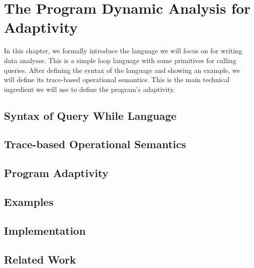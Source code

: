 \chapter{The Program Dynamic Analysis for Adaptivity}
\label{ch:adapt-dynamic}
In this chapter, we formally introduce the language we will focus on for writing data analyses.  
This is a simple loop language with some primitives for calling queries. 
After defining the syntax of the language and showing an example, we will define its trace-based operational semantics. This is the main technical ingredient we will use to define the program's adaptivity.

\section{Syntax of Query While Language}
\label{sec:dynamic-syntax}

\section{Trace-based Operational Semantics}
\label{sec:dynamic-os}
%
\section{Program Adaptivity}
\label{sec:dynamic-dynamic}
%
\section{Examples}
\label{sec:dynamic-examples}
%
\section{Implementation}
\label{sec:dynamic-implementation}
%
\section{Related Work}
\label{sec:dynamic-relatedwork}
